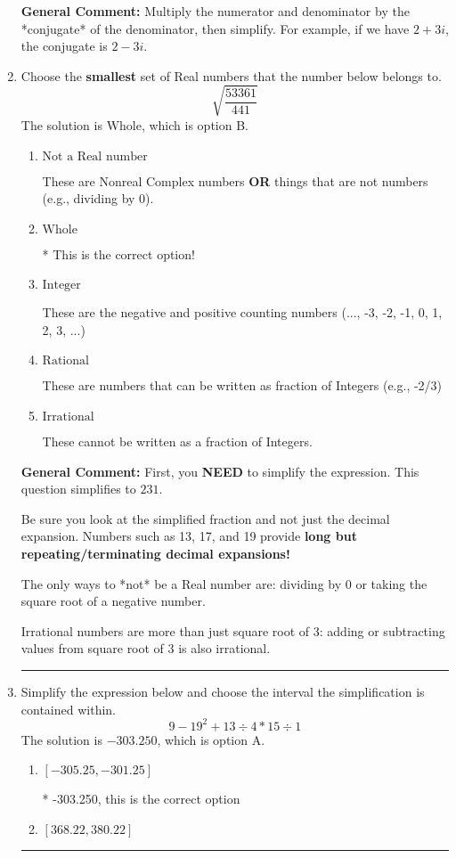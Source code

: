 \documentclass{extbook}[14pt]
\newcommand{\litem}[1]{\item #1

\rule{\textwidth}{0.4pt}}
\begin{document}
\begin{enumerate}
{\textbf{General Comment:} Multiply the numerator and denominator by the *conjugate* of the denominator, then simplify. For example, if we have $2+3i$, the conjugate is $2-3i$.
}
\litem{
Choose the \textbf{smallest} set of Real numbers that the number below belongs to.
\[ \sqrt{\frac{53361}{441}} \]The solution is \( \text{Whole} \), which is option B.\begin{enumerate}[label=\Alph*.]
\item \( \text{Not a Real number} \)

These are Nonreal Complex numbers \textbf{OR} things that are not numbers (e.g., dividing by 0).
\item \( \text{Whole} \)

* This is the correct option!
\item \( \text{Integer} \)

These are the negative and positive counting numbers (..., -3, -2, -1, 0, 1, 2, 3, ...)
\item \( \text{Rational} \)

These are numbers that can be written as fraction of Integers (e.g., -2/3)
\item \( \text{Irrational} \)

These cannot be written as a fraction of Integers.
\end{enumerate}

\textbf{General Comment:} First, you \textbf{NEED} to simplify the expression. This question simplifies to $231$. 
 
 Be sure you look at the simplified fraction and not just the decimal expansion. Numbers such as 13, 17, and 19 provide \textbf{long but repeating/terminating decimal expansions!} 
 
 The only ways to *not* be a Real number are: dividing by 0 or taking the square root of a negative number. 
 
 Irrational numbers are more than just square root of 3: adding or subtracting values from square root of 3 is also irrational.
}
\litem{
Simplify the expression below and choose the interval the simplification is contained within.
\[ 9 - 19^2 + 13 \div 4 * 15 \div 1 \]The solution is \( -303.250 \), which is option A.\begin{enumerate}[label=\Alph*.]
\item \( [-305.25, -301.25] \)

* -303.250, this is the correct option
\item \( [368.22, 380.22] \)


\end{enumerate}}
\end{enumerate}
\end{document}
